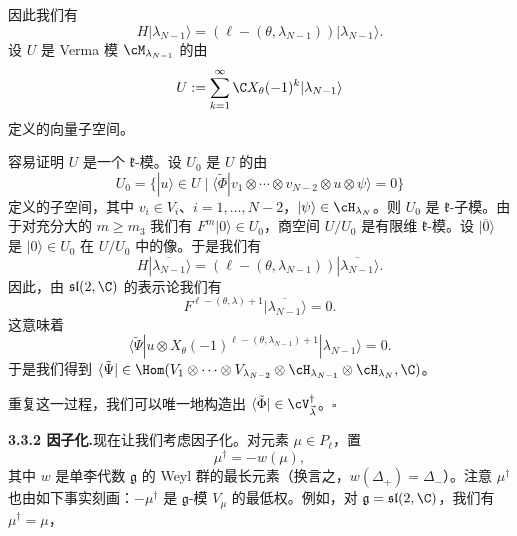 
因此我们有
\[
H|\lambda_{N-1}\rangle=(\ell-(\theta,\lambda_{N-1}))|\lambda_{N-1}\rangle.
\]
设 $U$ 是 Verma 模 $\cM_{\lambda_{N-1}}$ 的由
\[
U:=\sum_{k=1}^{\infty}\C X_\theta(-1)^{k}|\lambda_{N-1}\rangle
\]
定义的向量子空间。

容易证明 $U$ 是一个 $\mathfrak{k}$-模。设 $U_0$ 是 $U$ 的由
\[
U_0=\{|u\rangle\in U\mid
\langle\tilde\Phi|v_1\otimes\cdots\otimes v_{N-2}\otimes u\otimes\psi\rangle=0\}
\]
定义的子空间，其中 $v_i\in V_i$、$i=1,\dots,N-2$，$|\psi\rangle\in\cH_{\lambda_N}$。则 $U_0$ 是 $\mathfrak{k}$-子模。由于对充分大的 $m\ge m_3$ 我们有 $F^{m}|0\rangle\in U_0$，商空间 $U/U_0$ 是有限维 $\mathfrak{k}$-模。设 $|\overline{0}\rangle$ 是 $|0\rangle\in U_0$ 在 $U/U_0$ 中的像。于是我们有
\[
H|\overline{\lambda_{N-1}}\rangle
=(\ell-(\theta,\lambda_{N-1}))|\overline{\lambda_{N-1}}\rangle.
\]
因此，由 $\mathfrak{sl}(2,\C)$ 的表示论我们有
\[
F^{\ell-(\theta,\lambda)+1}|\overline{\lambda_{N-1}}\rangle=0.
\]
这意味着
\[
\langle\tilde\Psi|u\otimes X_\theta(-1)^{\ell-(\theta,\lambda_{N-1})+1}
|\lambda_{N-1}\rangle=0.
\]
于是我们得到
$\langle\tilde\Psi|\in\Hom(V_1\otimes\cdots\otimes V_{\lambda_{N-2}}
\otimes\cH_{\lambda_{N-1}}\otimes\cH_{\lambda_N},\C)$。

重复这一过程，我们可以唯一地构造出
$\langle\tilde\Phi|\in\cV^{\dagger}_{\vec{\lambda}}$。\hfill$\square$

\noindent\textbf{3.3.2 因子化.}\quad 现在让我们考虑因子化。对元素
$\mu\in P_\ell$，置
\[
\mu^{\dagger}=-w(\mu),
\]
其中 $w$ 是单李代数 $\mathfrak{g}$ 的 Weyl 群的最长元素（换言之，$w(\Delta_+)=\Delta_-$）。注意 $\mu^{\dagger}$ 也由如下事实刻画：$-\mu^{\dagger}$ 是 $\mathfrak{g}$-模 $V_\mu$ 的最低权。例如，对 $\mathfrak{g}=\mathfrak{sl}(2,\C)$，我们有 $\mu^{\dagger}=\mu$，


